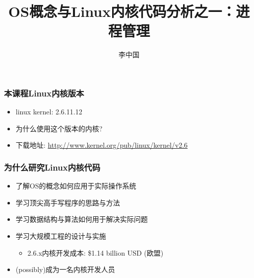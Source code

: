 \documentclass[xcolor=svgnames]{beamer}
\begin{document}
\begin{CJK*}{UTF8}{gbsn}


\title{OS概念与Linux内核代码分析之一：进程管理}
\author{李中国}

\begin{frame}
\maketitle
\end{frame}


\begin{frame}[fragile]
\frametitle{本课程Linux内核版本}
\begin{itemize}
\item linux kernel: 2.6.11.12 
\item 为什么使用这个版本的内核?
\item 下载地址: \url{http://www.kernel.org/pub/linux/kernel/v2.6}
\end{itemize}
\end{frame}

\begin{frame}[fragile]%
\frametitle{为什么研究Linux内核代码}
\begin{itemize}
\item 了解OS的概念如何应用于实际操作系统
\item 学习顶尖高手写程序的思路与方法
\item 学习数据结构与算法如何用于解决实际问题
\item 学习大规模工程的设计与实施
\begin{itemize}
\item 2.6.x内核开发成本: \$1.14 billion USD (欧盟)
\end{itemize}
\item (possibly)成为一名内核开发人员
\end{itemize}
\end{frame}


\end{CJK*}
\end{document}
